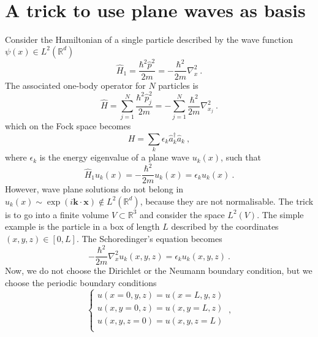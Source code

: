 \section{A trick to use plane waves as basis}

    Consider the Hamiltonian of a single particle described by the wave function $\psi (x) \in L^2 (\mathbb R^d)$ 
    \begin{equation*}
        \hat H_1 = \frac{\hbar^2 \hat p^2}{2m} = - \frac{\hbar^2}{2m} \nabla_x^2 ~.
    \end{equation*}
    The associated one-body operator for $N$ particles is 
    \begin{equation*}
        \hat H = \sum_{j = 1}^{N} \frac{\hbar^2 \hat p_j^2}{2m} = - \sum_{j = 1}^{N} \frac{\hbar^2}{2m} \nabla^2_{x_j} ~.
    \end{equation*}
    which on the Fock space becomes
    \begin{equation*}
        H = \sum_k \epsilon_k \hat a_k^\dagger \hat a_k ~,
    \end{equation*}
    where $\epsilon_k$ is the energy eigenvalue of a plane wave $u_k (x)$, such that
    \begin{equation*}
        \hat H_1 u_k (x) = - \frac{\hbar^2}{2m} u_k (x) = \epsilon_k u_k (x) ~.
    \end{equation*}
    However, wave plane solutions do not belong in $u_k(x) \sim \exp(i \mathbf k \cdot \mathbf x) \notin L^2 (\mathbb R^d)$, because they are not normalisable. The trick is to go into a finite volume $V \subset \mathbb R^3$ and consider the space $L^2(V)$. The simple example is the particle in a box of length $L$ described by the coordinates $(x,y,z) \in [0, L]$. The Schoredinger's equation becomes 
    \begin{equation*}
        - \frac{\hbar^2}{2m} \nabla_x^2 u_k (x,y,z) = \epsilon_k u_k (x,y,z) ~.
    \end{equation*}
    Now, we do not choose the Dirichlet or the Neumann boundary condition, but we choose the periodic boundary conditions 
    \begin{equation*}
        \begin{cases}
            u(x=0, y, z) = u(x = L, y, z) \\
            u(x, y=0, z) = u(x, y=L, z) \\
            u(x, y, z=0) = u(x, y, z=L) \\
        \end{cases} ~,
    \end{equation*}
